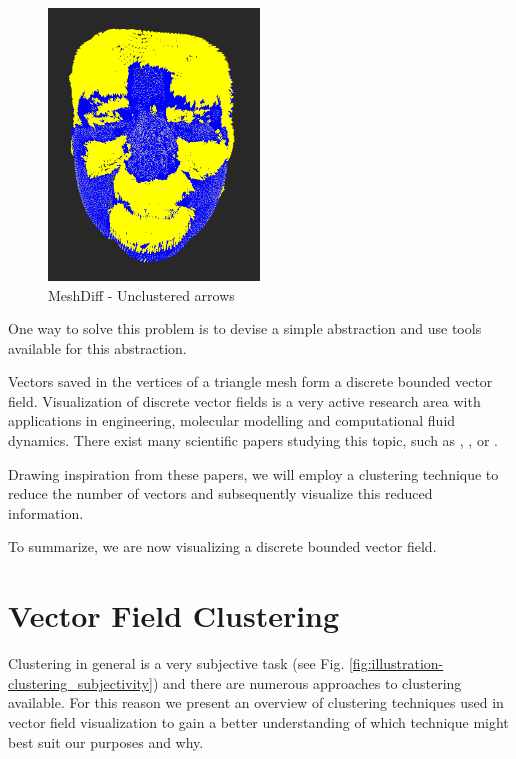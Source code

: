 \begin{figure}[h]
\centering
\includegraphics[width=0.5\textwidth]{./img/meshdiff-unclustered_arrows-single.png}
\caption[MeshDiff - Unclustered arrows]{MeshDiff - Unclustered arrows}
\label{fig:meshdiff-unclustered_vis}
\end{figure}

One way to solve this problem is to devise a simple abstraction and use tools available for this abstraction.

Vectors saved in the vertices of a triangle mesh form a discrete bounded vector field. Visualization of discrete vector fields is a very active research area with applications in engineering, molecular modelling and computational fluid dynamics. There exist many scientific papers studying this topic, such as \citet{Telea99}, \citet{Garcke00}, \citet{Du04} or \citet{Peng12}.

Drawing inspiration from these papers, we will employ a clustering technique to reduce the number of vectors and subsequently visualize this reduced information.

To summarize, we are now visualizing a discrete bounded vector field.

\section{Vector Field Clustering}
\label{sec:analysis-field_clustering}

Clustering in general is a very subjective task (see Fig. \ref{fig:illustration-clustering_subjectivity}) and there are numerous approaches to clustering available. For this reason we present an overview of clustering techniques used in vector field visualization to gain a better understanding of which technique might best suit our purposes and why.

